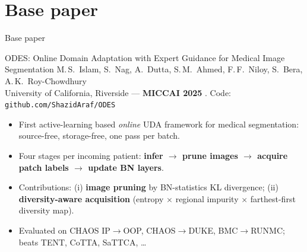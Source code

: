 \documentclass[aspectratio=169,10pt]{beamer}
\begin{document}
\section{Base paper}
\begin{frame}{Base paper}
  \begin{block}{ODES: Online Domain Adaptation with Expert Guidance for Medical Image Segmentation}
    M.\,S.~Islam, S.~Nag, A.~Dutta, S.\,M.~Ahmed, F.\,F.~Niloy, S.~Bera, A.\,K.~Roy-Chowdhury\\
    University of California, Riverside --- \textbf{MICCAI 2025} \cite{islam2025odes}. Code: \texttt{github.com/ShazidAraf/ODES}
  \end{block}
  \begin{itemize}
    \item First active-learning based \emph{online} UDA framework for medical segmentation: source-free, storage-free, one pass per batch.
    \item Four stages per incoming patient: \textbf{infer $\rightarrow$ prune images $\rightarrow$ acquire patch labels $\rightarrow$ update BN layers}.
    \item Contributions: (i) \textbf{image pruning} by BN-statistics KL divergence; (ii) \textbf{diversity-aware acquisition} (entropy $\times$ regional impurity $\times$ farthest-first diversity map).
    \item Evaluated on CHAOS IP$\rightarrow$OOP, CHAOS$\rightarrow$DUKE, BMC$\rightarrow$RUNMC; beats TENT, CoTTA, SaTTCA, \dots
  \end{itemize}
\end{frame}
\end{document}
